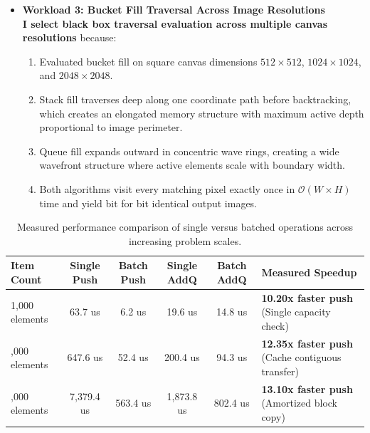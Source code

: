 \documentclass[10pt,a4paper]{article}
\begin{document}
\begin{itemize}[leftmargin=1.2em,noitemsep,topsep=2pt,parsep=1pt]
    \item \textbf{Workload 3: Bucket Fill Traversal Across Image Resolutions}\\[3pt]
    \textbf{I select black box traversal evaluation across multiple canvas resolutions} because:
    \begin{enumerate}[label=\arabic*),leftmargin=1.5em,noitemsep,topsep=1pt,parsep=1pt]
        \item Evaluated bucket fill on square canvas dimensions $512 \times 512$, $1024 \times 1024$, and $2048 \times 2048$.
        \item Stack fill traverses deep along one coordinate path before backtracking, which creates an elongated memory structure with maximum active depth proportional to image perimeter.
        \item Queue fill expands outward in concentric wave rings, creating a wide wavefront structure where active elements scale with boundary width.
        \item Both algorithms visit every matching pixel exactly once in $\mathcal{O}(W \times H)$ time and yield bit for bit identical output images.
    \end{enumerate}
\end{itemize}

\begin{table}[h!]
\centering
\small
\begin{tabularx}{\textwidth}{l c c c c X}
\toprule
\textbf{Item Count} & \textbf{Single Push} & \textbf{Batch Push} & \textbf{Single AddQ} & \textbf{Batch AddQ} & \textbf{Measured Speedup} \\
\midrule
1,000 elements & 63.7 us & 6.2 us & 19.6 us & 14.8 us & \textbf{10.20x faster push} (Single capacity check) \\
\addlinespace[2pt]
10,000 elements & 647.6 us & 52.4 us & 200.4 us & 94.3 us & \textbf{12.35x faster push} (Cache contiguous transfer) \\
\addlinespace[2pt]
100,000 elements & 7,379.4 us & 563.4 us & 1,873.8 us & 802.4 us & \textbf{13.10x faster push} (Amortized block copy) \\
\bottomrule
\end{tabularx}
\caption{Measured performance comparison of single versus batched operations across increasing problem scales.}
\end{table}
\end{document}
